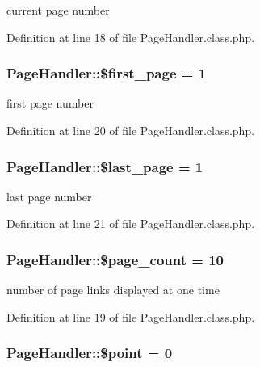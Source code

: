 current page number 



Definition at line 18 of file Page\+Handler.\+class.\+php.

\hypertarget{classPageHandler_adee671fac811b630df2886a43108b5ff}{
\subsubsection[{\$first\+\_\+page}]{\setlength{\rightskip}{0pt plus 5cm}Page\+Handler\+::\$first\+\_\+page = 1}}\label{classPageHandler_adee671fac811b630df2886a43108b5ff}


first page number 



Definition at line 20 of file Page\+Handler.\+class.\+php.

\hypertarget{classPageHandler_ad0a035b1ac1f86fe173d5ea4e8c2bef7}{
\subsubsection[{\$last\+\_\+page}]{\setlength{\rightskip}{0pt plus 5cm}Page\+Handler\+::\$last\+\_\+page = 1}}\label{classPageHandler_ad0a035b1ac1f86fe173d5ea4e8c2bef7}


last page number 



Definition at line 21 of file Page\+Handler.\+class.\+php.

\hypertarget{classPageHandler_a48a16aadd0c373c8856df7df954f90ff}{
\subsubsection[{\$page\+\_\+count}]{\setlength{\rightskip}{0pt plus 5cm}Page\+Handler\+::\$page\+\_\+count = 10}}\label{classPageHandler_a48a16aadd0c373c8856df7df954f90ff}


number of page links displayed at one time 



Definition at line 19 of file Page\+Handler.\+class.\+php.

\hypertarget{classPageHandler_a82a9b55cb98e79d46e6c6648cd2fca26}{
\subsubsection[{\$point}]{\setlength{\rightskip}{0pt plus 5cm}Page\+Handler\+::\$point = 0}}\label{classPageHandler_a82a9b55cb98e79d46e6c6648cd2fca26}


